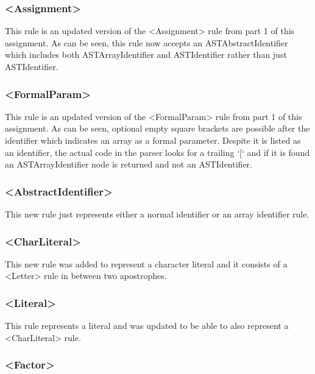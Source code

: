 \documentclass{article}
\begin{document}
								\subsubsection{\textless Assignment\textgreater}
				
								This rule is an updated version of the \textless Assignment\textgreater{} rule from part 1 of this assignment. As can be seen, this rule now accepts an ASTAbstractIdentifier which includes both ASTArrayIdentifier and ASTIdentifier rather than just ASTIdentifier.
				
				
				\subsubsection{\textless FormalParam\textgreater}
				
				This rule is an updated version of the \textless FormalParam\textgreater{} rule from part 1 of this assignment. As can be seen, optional empty square brackets are possible after the identifier which indicates an array as a formal parameter. Despite it is listed as an identifier, the actual code in the parser looks for a trailing `[` and if it is found an ASTArrayIdentifier node is returned and not an ASTIdentifier.
				
				\subsubsection{\textless AbstractIdentifier\textgreater}
				
				This new rule just represents either a normal identifier or an array identifier rule.
								
				
				\subsubsection{\textless CharLiteral\textgreater}
				
				This new rule was added to represent a character literal and it consists of a \textless Letter\textgreater{} rule in between two apostrophes.
				
				\subsubsection{\textless Literal\textgreater}
				
				This rule represents a literal and was updated to be able to also represent a \textless CharLiteral\textgreater {} rule.
				
				\subsubsection{\textless Factor\textgreater}
				
\end{document}
